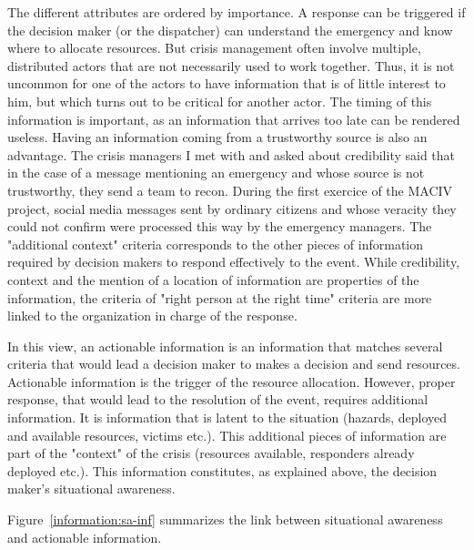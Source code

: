 The different attributes are ordered by importance.
A response can be triggered if the decision maker (or the dispatcher) can understand the emergency
and know where to allocate resources.
But crisis management often involve multiple, distributed actors that are not necessarily
used to work together.
Thus, it is not uncommon for one of the actors to have information that is of little interest to him,
but which turns out to be critical for another actor.
The timing of this information is important, as an information that arrives too late can be rendered useless.
Having an information coming from a trustworthy source is also an advantage.
The crisis managers I met with and asked about credibility said that in the case of a message
mentioning an emergency and whose source is not trustworthy, they send a team to recon.
During the first exercice of the MACIV project,  social media messages sent by ordinary
citizens and whose veracity they could not confirm were processed this way by the emergency managers.
The "additional context" criteria corresponds to the other pieces of information required
by decision makers to respond effectively to the event.
While credibility, context and the mention of a location of information are properties of
the information, the criteria of "right person at the right time" criteria are more linked
to the organization in charge of the response.

In this view, an actionable information is an information that matches several criteria
that would lead a decision maker to makes a decision and send resources.
Actionable information is the trigger of the resource allocation.
However, proper response, that would lead to the resolution of the event, requires additional
information.
It is information that is latent to the situation (hazards, deployed and available resources, victims etc.).
This additional pieces of information are part of the "context" of the crisis (resources available,
responders already deployed etc.).
This information constitutes, as explained above, the decision maker's situational awareness.

Figure~\ref{information:sa-inf} summarizes the link between situational awareness and actionable information.

